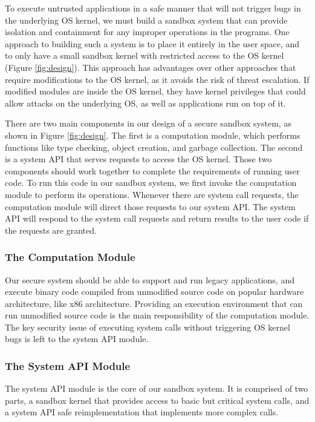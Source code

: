 To execute untrusted applications in a safe manner that will not trigger bugs 
in the underlying OS kernel, %
we must build a sandbox system that can provide isolation and 
containment for any improper operations in the programs. 
One approach to building such a system is to place it entirely in the user space, 
and to only have a small sandbox kernel with restricted access to the OS kernel (Figure \ref{fig:design}). 
This approach has advantages over other approaches that require modifications to 
the OS kernel, as it avoids the risk of threat escalation. If modified modules 
are inside the OS kernel, they have kernel privileges that could allow attacks on the underlying OS, 
as well as applications run on top of it. 

There are two main components in our design of a secure sandbox system, as shown in Figure \ref{fig:design}. 
The first is a computation module, which performs functions like type checking, object creation, 
and garbage collection. The second is a system API that serves requests to access the OS kernel. 
Those two components should work together to complete the requirements of running user code. 
To run this code in our sandbox system, we first invoke the computation module to perform its operations. 
Whenever there are system call requests, 
the computation module will direct those requests to our system API. 
The system API will respond to the system call requests and return results to the user code if the requests are granted. 

\subsubsection{The Computation Module}

Our secure system should be able to support and run legacy applications, 
and execute binary code compiled from unmodified source code on popular hardware architecture, 
like x86 architecture. Providing an execution environment that can run unmodified source code is 
the main responsibility of the computation module. The key security issue of executing system calls 
without triggering OS kernel bugs is left to the system API module.

\subsubsection{The System API Module}

The system API module is the core of our sandbox system. It is comprised of two parts, 
a sandbox kernel that provides access to basic but critical system calls, and a system 
API safe reimplementation that implements more complex calls. 

